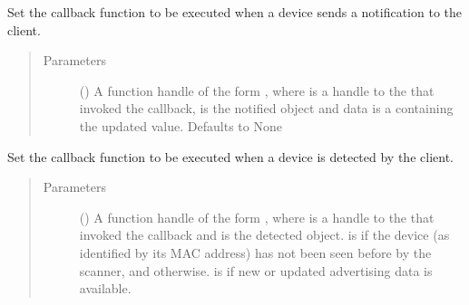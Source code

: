 \documentclass[letterpaper,10pt,english]{sphinxmanual}
\begin{document}
\begin{fulllineitems}
\begin{fulllineitems}
\label{\detokenize{PandaBot:PandaBot.PandaBotClient.setNotificationCallback}}
Set the callback function to be executed when a device sends a notification to the client.
\begin{quote}\begin{description}
\item[{Parameters}] \leavevmode
{} (\sphinxstyleliteralemphasis{\sphinxupquote{, }}) \textendash{} A function handle of the form , where  is a handle to the {\hyperref[\detokenize{PandaBot:PandaBot.PandaBotClient}]{}} that invoked the callback,  is the notified  object and data is a  containing the updated value. Defaults to None

\end{description}\end{quote}

\end{fulllineitems}


\begin{fulllineitems}
\label{\detokenize{PandaBot:PandaBot.PandaBotClient.setScanCallback}}
Set the callback function to be executed when a device is detected by the client.
\begin{quote}\begin{description}
\item[{Parameters}] \leavevmode
{} () \textendash{} A function handle of the form , where  is a handle to the {\hyperref[\detokenize{PandaBot:PandaBot.PandaBotClient}]{}} that invoked the callback and  is the detected {\hyperref[\detokenize{PandaBot:PandaBot.PandaBotDevice}]{}} object.  is  if the device (as identified by its MAC address) has not been seen before by the scanner, and  otherwise.  is  if new or updated advertising data is available.


\end{description}
\end{quote}
\end{fulllineitems}
\end{fulllineitems}
\end{document}
